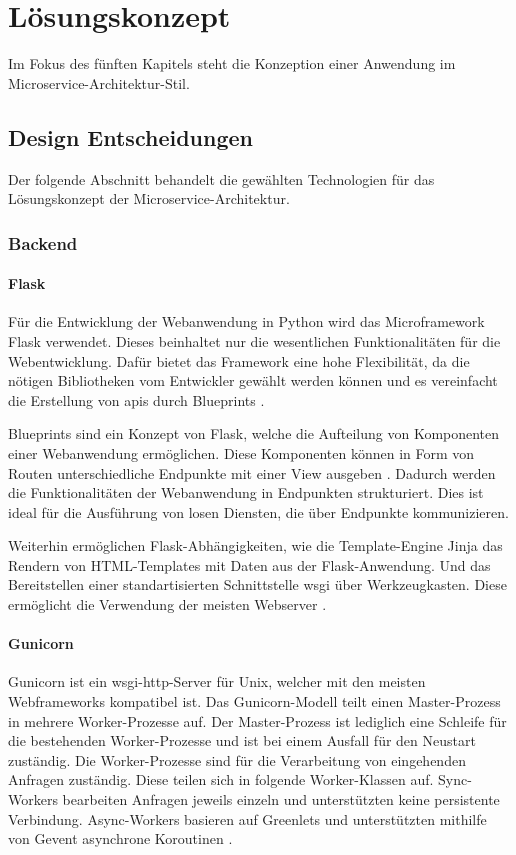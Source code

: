 \chapter{Lösungskonzept}\label{loesungskonzept}
Im Fokus des fünften Kapitels steht die Konzeption einer Anwendung im Microservice-Architektur-Stil.

\section{Design Entscheidungen}

Der folgende Abschnitt behandelt die gewählten Technologien für das Lösungskonzept der Microservice-Architektur.

\subsection{Backend}

\subsubsection{Flask}
Für die Entwicklung der Webanwendung in Python wird das Microframework Flask verwendet.
Dieses beinhaltet nur die wesentlichen Funktionalitäten für die Webentwicklung.
Dafür bietet das Framework eine hohe Flexibilität, da die nötigen Bibliotheken vom Entwickler gewählt werden können \cite{flaskdocu} und
es vereinfacht die Erstellung von \acs{api}s durch Blueprints \cite[S.11]{restfulpython}.

Blueprints sind ein Konzept von Flask, welche die Aufteilung von Komponenten einer Webanwendung ermöglichen.
Diese Komponenten können in Form von Routen unterschiedliche Endpunkte mit einer View ausgeben \cite{flaskdocu}.
Dadurch werden die Funktionalitäten der Webanwendung in Endpunkten strukturiert. 
Dies ist ideal für die Ausführung von losen Diensten, die über Endpunkte kommunizieren.

Weiterhin ermöglichen Flask-Abhängigkeiten, wie die Template-Engine Jinja das Rendern von HTML-Templates mit Daten aus der Flask-Anwendung.
Und das Bereitstellen einer standartisierten Schnittstelle \ac{wsgi} über Werkzeugkasten.
Diese ermöglicht die Verwendung der meisten Webserver \cite{flaskdocu}.


\subsubsection{Gunicorn}
Gunicorn ist ein \acs{wsgi}-\acs{http}-Server für Unix, welcher mit den meisten Webframeworks kompatibel ist.
Das Gunicorn-Modell teilt einen Master-Prozess in mehrere Worker-Prozesse auf.
Der Master-Prozess ist lediglich eine Schleife für die bestehenden Worker-Prozesse
und ist bei einem Ausfall für den Neustart zuständig.
Die Worker-Prozesse sind für die Verarbeitung von eingehenden Anfragen zuständig.
Diese teilen sich in folgende Worker-Klassen auf. 
Sync-Workers bearbeiten Anfragen jeweils einzeln und unterstützten keine persistente Verbindung.
Async-Workers basieren auf Greenlets und unterstützten mithilfe von Gevent asynchrone Koroutinen \cite{gunciorndocs}. 

